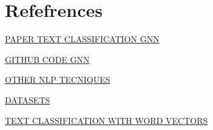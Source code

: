 \noindent
\noindent
\section{Refefrences}

\newline
\href{https://arxiv.org/abs/1809.05679}{PAPER TEXT CLASSIFICATION GNN}

\newline
\href{https://github.com/yao8839836/text_gcn}{GITHUB CODE GNN}

\newline
\href{https://medium.com/text-classification-algorithms/text-classification-algorithms-a-survey-a215b7ab7e2d}{OTHER NLP TECNIQUES}

\newline
\href{https://www.kaggle.com/code/dvircohen0/text-classification-with-word-vectors}{DATASETS}

\newline
\href{https://www.kaggle.com/code/dvircohen0/text-classification-with-word-vectors}{TEXT CLASSIFICATION WITH WORD VECTORS}